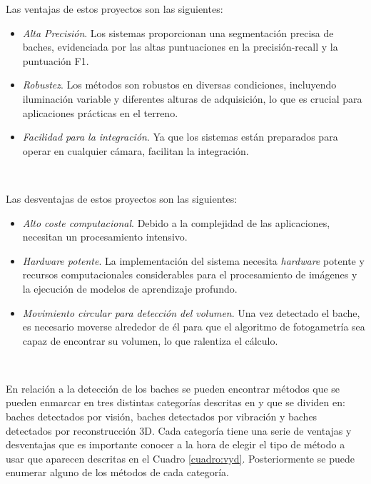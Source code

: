 Las ventajas de estos proyectos son las siguientes:

\begin{itemize}
	\item \textit{Alta Precisión}. Los sistemas proporcionan una segmentación precisa de baches, evidenciada por las altas puntuaciones en la precisión-recall y la puntuación F1.
	\item \textit{Robustez}. Los métodos son robustos en diversas condiciones, incluyendo iluminación variable y diferentes alturas de adquisición, lo que es crucial para aplicaciones prácticas en el terreno.
	\item \textit{Facilidad para la integración}. Ya que los sistemas están preparados para operar en cualquier cámara, facilitan la integración.
	
\end{itemize}\


Las desventajas de estos proyectos son las siguientes:
\begin{itemize}
	\item \textit{Alto coste computacional}. Debido a la complejidad de las aplicaciones, necesitan un procesamiento intensivo. 
	\item \textit{Hardware potente}. La implementación del sistema necesita \textit{hardware} potente y recursos computacionales considerables para el procesamiento de imágenes y la ejecución de modelos de aprendizaje profundo.
	\item \textit{Movimiento circular para detección del volumen}. Una vez detectado el bache, es necesario moverse alrededor de él para que el algoritmo de fotogametría sea capaz de encontrar su volumen, lo que ralentiza el cálculo.
	
\end{itemize}\


En relación a la detección de los baches se pueden encontrar métodos que se pueden enmarcar en tres distintas categorías descritas en \cite{app12115320} y que se dividen en: baches detectados por visión, baches detectados por vibración y baches detectados por reconstrucción 3D. Cada categoría tiene una serie de ventajas y desventajas que es importante conocer a la hora de elegir el tipo de método a usar que aparecen descritas en el Cuadro \ref{cuadro:vyd}. Posteriormente se puede enumerar alguno de los métodos de cada categoría.

